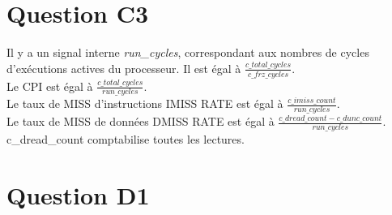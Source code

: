 \documentclass[10pt]{article}
\begin{document}
\section{Question C3}
Il y a un signal interne {\it run\_cycles}, correspondant aux nombres de cycles
d'exécutions actives du processeur. Il est égal à
$\frac{c\_total\_cycles}{c\_frz\_cycles}$.\\
Le CPI est égal à $\frac{c\_total\_cycles}{run\_cycles}$.\\
Le taux de MISS d'instructions IMISS RATE est égal à
$\frac{c\_imiss\_count}{run\_cycles}$.\\
Le taux de MISS de données DMISS RATE est égal à
$\frac{{c\_dread\_count}-{c\_dunc\_count}}{run\_cycles}$.\\
c\_dread\_count comptabilise toutes les lectures.

\section{Question D1}
\end{document}
